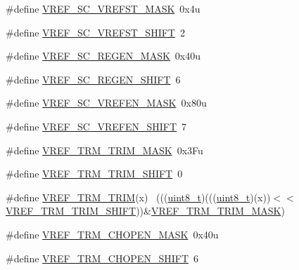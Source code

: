 \begin{DoxyCompactItemize}
\item 
\#define \hyperlink{group___v_r_e_f___register___masks_gadc4f84c737775ee82f350149ade8f5bf}{V\+R\+E\+F\+\_\+\+S\+C\+\_\+\+V\+R\+E\+F\+S\+T\+\_\+\+M\+A\+SK}~0x4u
\item 
\#define \hyperlink{group___v_r_e_f___register___masks_ga88b36251362ceabbeeb2302dae65000d}{V\+R\+E\+F\+\_\+\+S\+C\+\_\+\+V\+R\+E\+F\+S\+T\+\_\+\+S\+H\+I\+FT}~2
\item 
\#define \hyperlink{group___v_r_e_f___register___masks_ga1396c56eb73d89394a57b1f83f20c9ea}{V\+R\+E\+F\+\_\+\+S\+C\+\_\+\+R\+E\+G\+E\+N\+\_\+\+M\+A\+SK}~0x40u
\item 
\#define \hyperlink{group___v_r_e_f___register___masks_gacfe64ba6f4a76a4aef274f2fedb95a90}{V\+R\+E\+F\+\_\+\+S\+C\+\_\+\+R\+E\+G\+E\+N\+\_\+\+S\+H\+I\+FT}~6
\item 
\#define \hyperlink{group___v_r_e_f___register___masks_ga2df8186aa60a77e25e67589bc50ce539}{V\+R\+E\+F\+\_\+\+S\+C\+\_\+\+V\+R\+E\+F\+E\+N\+\_\+\+M\+A\+SK}~0x80u
\item 
\#define \hyperlink{group___v_r_e_f___register___masks_gaca5e397ea8b43f55854f4a6b80ec479b}{V\+R\+E\+F\+\_\+\+S\+C\+\_\+\+V\+R\+E\+F\+E\+N\+\_\+\+S\+H\+I\+FT}~7
\item 
\#define \hyperlink{group___v_r_e_f___register___masks_gaf233ddf56401003ec721b808d3910978}{V\+R\+E\+F\+\_\+\+T\+R\+M\+\_\+\+T\+R\+I\+M\+\_\+\+M\+A\+SK}~0x3\+Fu
\item 
\#define \hyperlink{group___v_r_e_f___register___masks_ga7738b4edb18c8c9dcb36d6be564c80e6}{V\+R\+E\+F\+\_\+\+T\+R\+M\+\_\+\+T\+R\+I\+M\+\_\+\+S\+H\+I\+FT}~0
\item 
\#define \hyperlink{group___v_r_e_f___register___masks_gac340a7abf4c9caf1594346d71a475a30}{V\+R\+E\+F\+\_\+\+T\+R\+M\+\_\+\+T\+R\+IM}(x)                                              ~(((\hyperlink{_p_e___types_8h_aba7bc1797add20fe3efdf37ced1182c5}{uint8\+\_\+t})(((\hyperlink{_p_e___types_8h_aba7bc1797add20fe3efdf37ced1182c5}{uint8\+\_\+t})(x))$<$$<$\hyperlink{group___v_r_e_f___register___masks_ga7738b4edb18c8c9dcb36d6be564c80e6}{V\+R\+E\+F\+\_\+\+T\+R\+M\+\_\+\+T\+R\+I\+M\+\_\+\+S\+H\+I\+FT}))\&\hyperlink{group___v_r_e_f___register___masks_gaf233ddf56401003ec721b808d3910978}{V\+R\+E\+F\+\_\+\+T\+R\+M\+\_\+\+T\+R\+I\+M\+\_\+\+M\+A\+SK})
\item 
\#define \hyperlink{group___v_r_e_f___register___masks_gaca90564d0247d6637d487fa045dbe328}{V\+R\+E\+F\+\_\+\+T\+R\+M\+\_\+\+C\+H\+O\+P\+E\+N\+\_\+\+M\+A\+SK}~0x40u
\item 
\#define \hyperlink{group___v_r_e_f___register___masks_gad66c35e7a2372a16a0ef1042ad0d029a}{V\+R\+E\+F\+\_\+\+T\+R\+M\+\_\+\+C\+H\+O\+P\+E\+N\+\_\+\+S\+H\+I\+FT}~6
$$
\end{DoxyCompactItemize}
